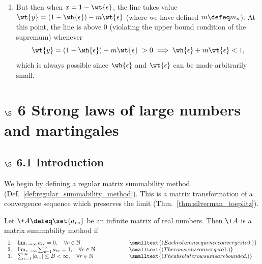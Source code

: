 \documentclass{article} %
\begin{document}
\begin{remark}
\begin{enumerate}
\item But then when $x = 1 - \wt{\epsilon}$, the line takes value $\wt{y} = (1 - \wh{\epsilon}) - m \wt{\epsilon}$ (where we have defined $m \defeq m_n$).  At this point, the line is above 0 (violating the upper bound condition of the supremum) whenever 
\[ \wt{y} = (1 - \wh{\epsilon}) - m \wt{\epsilon} \; > 0 \implies \wh{\epsilon} + m \wt{\epsilon} < 1,\]
which is always possible since $\wh{\epsilon}$ and $\wt{\epsilon}$ can be made arbitrarily small.   
\end{enumerate}

\end{remark}





\section{$\S$ 6 Strong laws of large numbers and martingales}

\subsection{$\S$ 6.1 Introduction}

We begin by defining a regular matrix summability method (Def.~\ref{def:regular_summability_method}). This is a matrix transformation of a convergence sequence which preserves the limit (Thm.~\ref{thm:silverman_toeplitz}). 

\begin{definition}
Let $\+A \defeq \set{a_{rc}}$ be an infinite matrix of real numbers.  Then $\+A$ is a matrix summability method if 
\[\begin{array}{rlcl}
1. & \lim_{r \to \infty} a_{rc}=0, \quad \forall c \in \mathbb{N}&
\qquad \qquad & \smalltext{(Each column sequence converges to 0.)} \\
2. & \lim_{r \to \infty} \sum_{c=1}^\infty a_{rc}=1, \quad \forall c \in \mathbb{N}&
\qquad \qquad & \smalltext{(The row sums converge to 1.)} \\
3. & \sum_{c=1}^\infty |a_{rc}| \leq B < \infty, \quad \forall r \in \mathbb{N}&
\qquad \qquad & \smalltext{(The absolute row sums are bounded.)}
\end{array} \] 
\label{def:regular_summability_method}
\end{definition}
\end{document}

